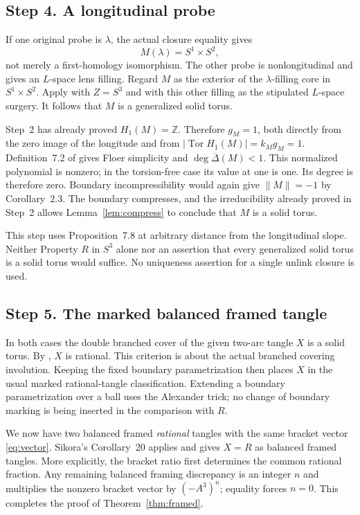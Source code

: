 \documentclass[11pt]{amsart}
\theoremstyle{definition}
\theoremstyle{remark}
\newcommand{\Z}{\mathbb Z}
\newcommand{\Tor}{\operatorname{Tor}}
\begin{document}
\subsection*{Step 4. A longitudinal probe}

If one original probe is \(\lambda\),
the actual closure equality gives
\[
 M(\lambda)=S^1\times S^2,
\]
not merely a first-homology isomorphism.
The other probe is nonlongitudinal and
gives an \(L\)-space lens filling.
Regard \(M\) as the exterior of the
\(\lambda\)-filling core in \(S^1\times S^2\).
Apply \cite[Proposition~7.8]{RR} with
\(Z=S^3\) and with this other filling as
the stipulated \(L\)-space surgery.
It follows that \(M\) is a generalized
solid torus.

Step~2 has already proved \(H_1(M)=\Z\).
Therefore \(g_M=1\), both directly from
the zero image of the longitude and
from \(|\Tor H_1(M)|=k_Mg_M=1\).
Definition~7.2 of \cite{RR} gives
Floer simplicity and
\(\deg\overline\Delta(M)<1\).
This normalized polynomial is nonzero;
in the torsion-free case its value at
one is one. Its degree is therefore zero.
Boundary incompressibility would again
give \(\|M\|=-1\) by Corollary~2.3.
The boundary compresses, and the
irreducibility already proved in Step~2
allows Lemma~\ref{lem:compress} to
conclude that \(M\) is a solid torus.

This step uses Proposition~7.8 at arbitrary
distance from the longitudinal slope.
Neither Property \(R\) in \(S^3\) alone
nor an assertion that every generalized
solid torus is a solid torus would suffice.
No uniqueness assertion for a single
unlink closure is used.

\subsection*{Step 5. The marked balanced framed tangle}

In both cases the double branched cover
of the given two-arc tangle \(X\) is a
solid torus. By \cite[Theorem~3.5(2)]{BM},
\(X\) is rational. This criterion is
about the actual branched covering
involution. Keeping the fixed
boundary parametrization then places
\(X\) in the usual marked rational-tangle
classification. Extending a boundary
parametrization over a ball uses the
Alexander trick; no change of boundary
marking is being inserted in the
comparison with \(R\).

We now have two balanced framed
\emph{rational} tangles with the same
bracket vector \eqref{eq:vector}.
Sikora's Corollary~20 applies and gives
\(X=R\) as balanced framed tangles.
More explicitly, the bracket ratio
first determines the common rational
fraction. Any remaining balanced
framing discrepancy is an integer \(n\)
and multiplies the nonzero bracket
vector by \((-A^3)^n\); equality forces
\(n=0\). This completes the proof of
Theorem~\ref{thm:framed}.
\end{document}
